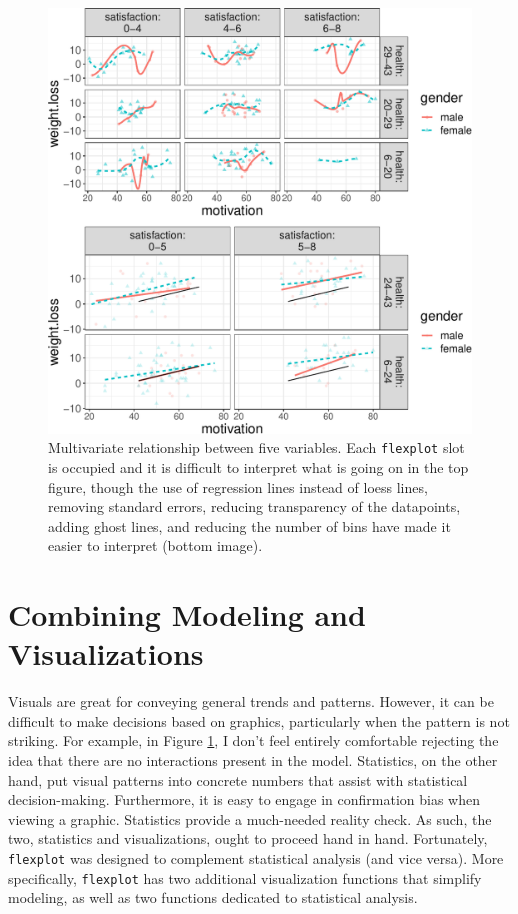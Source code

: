 \documentclass[
  doc]{apa6}
\begin{document}
\begin{figure}
\centering
\includegraphics{flexplot_psychmeth_files/figure-latex/threeway-1.pdf}
\caption{\label{fig:threeway}Multivariate relationship between five variables. Each \texttt{flexplot} slot is occupied and it is difficult to interpret what is going on in the top figure, though the use of regression lines instead of loess lines, removing standard errors, reducing transparency of the datapoints, adding ghost lines, and reducing the number of bins have made it easier to interpret (bottom image). \label{fig:threeway}}
\end{figure}

\hypertarget{combining-modeling-and-visualizations}{%
\section{Combining Modeling and Visualizations}\label{combining-modeling-and-visualizations}}

Visuals are great for conveying general trends and patterns. However, it can be difficult to make decisions based on graphics, particularly when the pattern is not striking. For example, in Figure \ref{fig:threeway}, I don't feel entirely comfortable rejecting the idea that there are no interactions present in the model. Statistics, on the other hand, put visual patterns into concrete numbers that assist with statistical decision-making. Furthermore, it is easy to engage in confirmation bias when viewing a graphic. Statistics provide a much-needed reality check. As such, the two, statistics and visualizations, ought to proceed hand in hand. Fortunately, \texttt{flexplot} was designed to complement statistical analysis (and vice versa). More specifically, \texttt{flexplot} has two additional visualization functions that simplify modeling, as well as two functions dedicated to statistical analysis.
\end{document}
